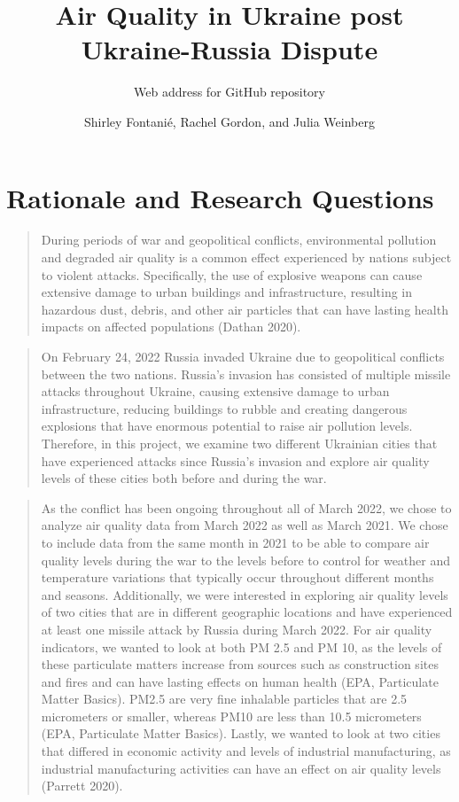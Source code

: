 \documentclass[
  12pt,
]{article}
\title{Air Quality in Ukraine post Ukraine-Russia Dispute}
\subtitle{Web address for GitHub repository}
\author{Shirley Fontanié, Rachel Gordon, and Julia Weinberg}
\date{}
\begin{document}
\maketitle

\newpage
\tableofcontents 
\newpage
\listoftables 
\newpage
\listoffigures 
\newpage

\hypertarget{rationale-and-research-questions}{%
\section{Rationale and Research
Questions}\label{rationale-and-research-questions}}

\begin{quote}
During periods of war and geopolitical conflicts, environmental
pollution and degraded air quality is a common effect experienced by
nations subject to violent attacks. Specifically, the use of explosive
weapons can cause extensive damage to urban buildings and
infrastructure, resulting in hazardous dust, debris, and other air
particles that can have lasting health impacts on affected populations
(Dathan 2020).
\end{quote}

\begin{quote}
On February 24, 2022 Russia invaded Ukraine due to geopolitical
conflicts between the two nations. Russia's invasion has consisted of
multiple missile attacks throughout Ukraine, causing extensive damage to
urban infrastructure, reducing buildings to rubble and creating
dangerous explosions that have enormous potential to raise air pollution
levels. Therefore, in this project, we examine two different Ukrainian
cities that have experienced attacks since Russia's invasion and explore
air quality levels of these cities both before and during the war.
\end{quote}

\begin{quote}
As the conflict has been ongoing throughout all of March 2022, we chose
to analyze air quality data from March 2022 as well as March 2021. We
chose to include data from the same month in 2021 to be able to compare
air quality levels during the war to the levels before to control for
weather and temperature variations that typically occur throughout
different months and seasons. Additionally, we were interested in
exploring air quality levels of two cities that are in different
geographic locations and have experienced at least one missile attack by
Russia during March 2022. For air quality indicators, we wanted to look
at both PM 2.5 and PM 10, as the levels of these particulate matters
increase from sources such as construction sites and fires and can have
lasting effects on human health (EPA, Particulate Matter Basics). PM2.5
are very fine inhalable particles that are 2.5 micrometers or smaller,
whereas PM10 are less than 10.5 micrometers (EPA, Particulate Matter
Basics). Lastly, we wanted to look at two cities that differed in
economic activity and levels of industrial manufacturing, as industrial
manufacturing activities can have an effect on air quality levels
(Parrett 2020).
\end{quote}
\end{document}
